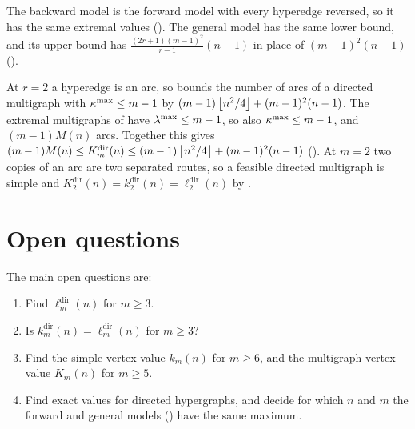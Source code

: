 The backward model is the forward model with every hyperedge reversed, so it has the same extremal values ().
The general model has the same lower bound, and its upper bound has $\frac{(2r+1)(m-1)^2}{r-1}(n-1)$ in place of $(m-1)^2(n-1)$ ().

At $r=2$ a hyperedge is an arc, so  bounds the number of arcs of a directed multigraph with $\kappa^{\max}\le m-1$ by $(m-1)\left\lfloor n^2/4 \right\rfloor+(m-1)^2(n-1)$.
The extremal multigraphs of  have $\lambda^{\max}\le m-1$, so also $\kappa^{\max}\le m-1$, and $(m-1)M(n)$ arcs.
Together this gives $(m-1)M(n)\le K_m^{\mathrm{dir}}(n)\le(m-1)\left\lfloor n^2/4 \right\rfloor+(m-1)^2(n-1)$ ().
At $m=2$ two copies of an arc are two separated routes, so a feasible directed multigraph is simple and $K_2^{\mathrm{dir}}(n)=k_2^{\mathrm{dir}}(n)=\ell_2^{\mathrm{dir}}(n)$ by .

\section{Open questions}\label{sec:overview}


The main open questions are:
\begin{enumerate}
\item Find $\ell_m^{\mathrm{dir}}(n)$ for $m\ge3$.
\item Is $k_m^{\mathrm{dir}}(n)=\ell_m^{\mathrm{dir}}(n)$ for $m\ge3$?
\item Find the simple vertex value $k_m(n)$ for $m\ge6$, and the multigraph vertex value $K_m(n)$ for $m\ge5$.
\item Find exact values for directed hypergraphs, and decide for which $n$ and $m$ the forward and general models () have the same maximum.
\end{enumerate}
